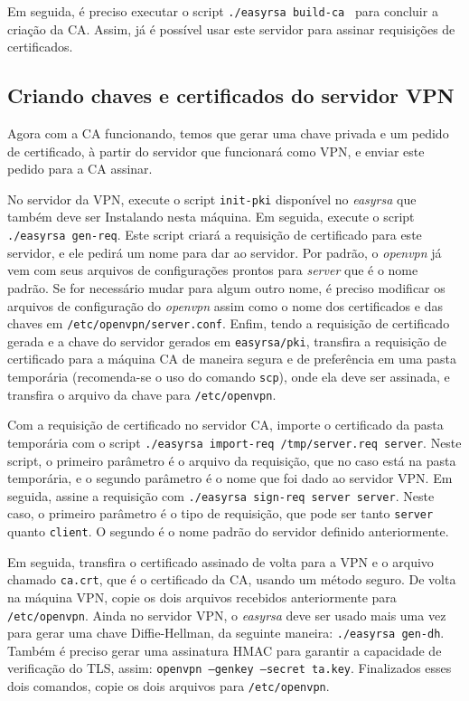 \documentclass[12pt]{article}
\begin{document}
\begin{flushleft}
Em seguida, é preciso executar o script \texttt{./easyrsa build-ca } para concluir a criação da CA. Assim, já 
é possível usar este servidor para assinar requisições de certificados. 

\subsection{Criando chaves e certificados do servidor VPN}

Agora com a CA funcionando, temos que gerar uma chave privada e um pedido de certificado, à partir do servidor
que funcionará como VPN, e enviar este pedido para a CA assinar. 

No servidor da VPN, execute o script \texttt{init-pki} disponível no \emph{easyrsa} que também deve ser Instalando
nesta máquina. Em seguida, execute o script \texttt{./easyrsa gen-req}. Este script criará a requisição de certificado
para este servidor, e ele pedirá um nome para dar ao servidor. Por padrão, o \emph{openvpn} já vem com seus arquivos
de configurações prontos para \emph{server} que é o nome padrão. Se for necessário mudar para algum outro nome, é preciso
modificar os arquivos de configuração do \emph{openvpn} assim como o nome dos certificados e das chaves em \texttt{/etc/openvpn/server.conf}.
Enfim, tendo a requisição de certificado gerada e a chave do servidor gerados em \texttt{easyrsa/pki}, transfira a requisição
de certificado para a máquina CA de maneira segura e de preferência em uma pasta temporária (recomenda-se o uso do comando \texttt{scp}), onde ela deve ser assinada, e 
transfira o arquivo da chave para \texttt{/etc/openvpn}.

Com a requisição de certificado no servidor CA, importe o certificado da pasta temporária com o script 
\texttt{./easyrsa import-req /tmp/server.req server}. Neste script, o primeiro parâmetro é o arquivo da requisição,
que no caso está na pasta temporária, e o segundo parâmetro é o nome que foi dado ao servidor VPN. Em seguida,
assine a requisição com \texttt{./easyrsa sign-req server server}. Neste caso, o primeiro parâmetro é o tipo de 
requisição, que pode ser tanto \texttt{server} quanto \texttt{client}. O segundo é o nome padrão do servidor definido anteriormente.

Em seguida, transfira o certificado assinado de volta para a VPN e o arquivo chamado
\texttt{ca.crt}, que é o certificado da CA, usando um método seguro. De volta na máquina VPN, copie os dois arquivos recebidos 
anteriormente para \texttt{/etc/openvpn}. Ainda no servidor VPN, o \emph{easyrsa} deve ser usado mais uma vez para
gerar uma chave Diffie-Hellman, da seguinte maneira: \texttt{./easyrsa gen-dh}. Também é preciso gerar uma
assinatura HMAC para garantir a capacidade de verificação do TLS, assim: \texttt{openvpn --genkey --secret ta.key}.
Finalizados esses dois comandos, copie os dois arquivos para \texttt{/etc/openvpn}. 


\end{flushleft}
\end{document}
